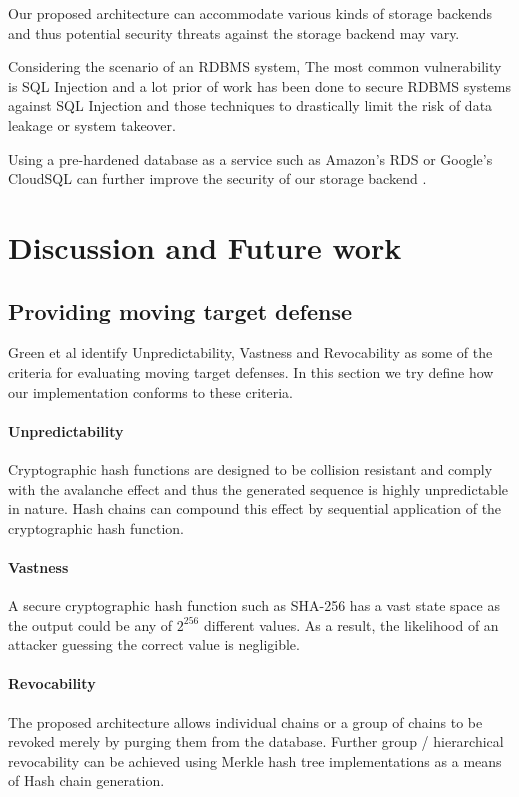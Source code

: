 \documentclass[a4paper,twoside]{article}
\begin{document}
Our proposed architecture can accommodate various kinds of storage backends and thus potential security threats against the storage backend may vary. 

Considering the scenario of an RDBMS system, The most common vulnerability is SQL Injection and a lot prior of work has been done to secure RDBMS systems against SQL Injection \cite{halfond_amnesia:_2005, boyd_sqlrand:_2004, halfond_classification_2006} and those techniques to drastically limit the risk of data leakage or system takeover.

Using a pre-hardened database as a service such as Amazon's RDS or Google's CloudSQL can further improve the security of our storage backend \cite{curino_relational_2011} .

\section{Discussion and Future work}
\label{sec:future}
\subsection{Providing moving target defense}

Green et al \cite{green_characterizing_2015} identify Unpredictability, Vastness and Revocability as some of the criteria for evaluating moving target defenses. In this section we try define how our implementation conforms to these criteria.

\paragraph*{Unpredictability} Cryptographic hash functions \cite{rogaway_cryptographic_2004} are designed to be collision resistant and comply with the avalanche effect and thus the generated sequence is highly unpredictable in nature. Hash chains can compound this effect by sequential application of the cryptographic hash function.

\paragraph*{Vastness} A secure cryptographic hash function such as SHA-256 has a vast state space as the output could be any of $2^{256}$ different values.  As a result, the likelihood of an attacker guessing the correct value is negligible.

\paragraph*{Revocability} The proposed architecture allows individual chains or a group of chains to be revoked merely by purging them from the database. Further group / hierarchical revocability can be achieved using Merkle hash tree implementations as a means of Hash chain generation.
\end{document}

